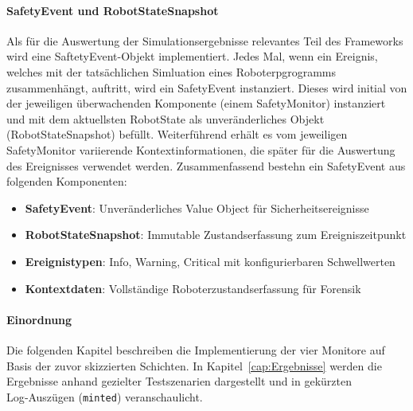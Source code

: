 \paragraph{SafetyEvent und RobotStateSnapshot}
Als für die Auswertung der Simulationsergebnisse relevantes Teil des Frameworks
wird eine SaftetyEvent-Objekt implementiert. Jedes Mal, wenn ein Ereignis,
welches mit der tatsächlichen Simluation eines Roboterpgrogramms zusammenhängt,
auftritt, wird ein SafetyEvent instanziert. Dieses wird initial von der
jeweiligen überwachenden Komponente (einem SafetyMonitor) instanziert und mit
dem aktuellsten RobotState als unveränderliches Objekt (RobotStateSnapshot) befüllt.
Weiterführend erhält es vom jeweiligen SafetyMonitor variierende
Kontextinformationen, die später für die Auswertung des Ereignisses verwendet
werden. Zusammenfassend bestehn ein SafetyEvent aus folgenden Komponenten:
\begin{itemize}
	\item \textbf{SafetyEvent}: Unveränderliches Value Object für Sicherheitsereignisse
	\item \textbf{RobotStateSnapshot}: Immutable Zustandserfassung zum Ereigniszeitpunkt
	\item \textbf{Ereignistypen}: Info, Warning, Critical mit konfigurierbaren Schwellwerten
	\item \textbf{Kontextdaten}: Vollständige Roboterzustandserfassung für Forensik
\end{itemize}

\paragraph{Einordnung}
Die folgenden Kapitel beschreiben die Implementierung der vier Monitore auf Basis
der zuvor skizzierten Schichten. In Kapitel~\ref{cap:Ergebnisse} werden die
Ergebnisse anhand gezielter Testszenarien dargestellt und in gekürzten
Log‑Auszügen (\texttt{minted}) veranschaulicht.
